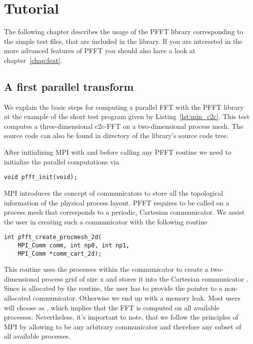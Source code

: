 \chapter{Tutorial}\label{chap:tuto}

The following chapter describes the usage of the PFFT library corresponding to the simple test files,
that are included in the library. If you are interested in the more advanced features of PFFT you
should also have a look at chapter~\ref{chap:feat}.

\section{A first parallel transform}
We explain the basic steps for computing a parallel FFT with the PFFT library at the example
of the short test program given by Listing~\ref{lst:min_c2c}. This test computes a three-dimensional c2c-FFT on
a two-dimensional process mesh. The source code can also be found in directory 
of the library's source code tree. 


After initializing MPI with  and before calling any PFFT routine we need to initialize
the parallel computations via
\begin{lstlisting}
void pfft_init(void);
\end{lstlisting}
MPI introduces the concept of communicators to store all the topological information of the physical process layout.
PFFT requires to be called on a process mesh that corresponds to a periodic, Cartesian communicator.
We assist the user in creating such a communicator with the following routine
\begin{lstlisting}
int pfft_create_procmesh_2d(
    MPI_Comm comm, int np0, int np1,
    MPI_Comm *comm_cart_2d);
\end{lstlisting}
This routine uses the processes within the communicator  to create a two-dimensional process
grid of size  x  and stores it into the Cartesian communicator .
Since  is allocated by the routine, the user has to provide
the pointer to a non-allocated communicator. Otherwise we end up with a memory leak.
Most users will choose  as , which implies that the FFT is computed
on all available processes. Nevertheless, it's important to note, that we follow the principles of MPI
by allowing  to be any arbitrary communicator and therefore any subset of all available processes.

